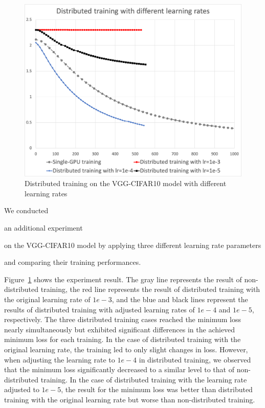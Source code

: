 \begin{figure}%
  \centering
  \includegraphics[width=.8\textwidth]{lr-exp-graph}
  \caption{Distributed training on the VGG-CIFAR10 model with different learning rates}
  \label{fig:eval:cifar10}
\end{figure}

We conducted \begin{inred}an additional experiment\end{inred} on the VGG-CIFAR10 
model by applying three different learning rate parameters 
\begin{inred}and comparing their training performances.\end{inred} 
Figure~\ref{fig:eval:cifar10} shows the experiment result.
The gray line represents the result of non-distributed training, the red line
represents the result of distributed training with the original learning rate
of $1e-3$, and the blue and black lines represent the results of distributed
training with adjusted learning rates of $1e-4$ and $1e-5$, respectively.
The three distributed training cases reached the minimum loss nearly
simultaneously but exhibited significant differences in the
achieved minimum loss for each training.
In the case of distributed training with the original learning rate, the
training led to only slight changes in loss.
However, when adjusting the learning rate to $1e-4$ in distributed training, 
we observed that the minimum loss significantly decreased to a similar level
to that of non-distributed training.
In the case of distributed training with the learning rate adjusted to $1e-5$,
the result for the minimum loss was better than distributed training with the
original learning rate but worse than non-distributed training.

